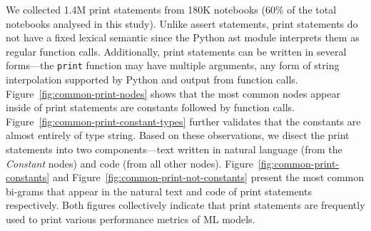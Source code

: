 We collected 1.4M print statements from 180K notebooks (60\% of the total notebooks analysed in this study). Unlike assert statements, print statements do not have a fixed lexical semantic since the Python ast module interprets them as regular function calls. Additionally, print statements can be written in several forms---the \lstinline{print} function may have multiple arguments, any form of string interpolation supported by Python and output from function calls. Figure~\ref{fig:common-print-nodes} shows that the most common nodes appear inside of print statements are constants followed by function calls. Figure~\ref{fig:common-print-constant-types} further validates that the constants are almost entirely of type string. Based on these observations, we disect the print statements into two components---text written in natural language (from the \emph{Constant} nodes) and code (from all other nodes). Figure~\ref{fig:common-print-constants} and Figure~\ref{fig:common-print-not-constants} present the most common bi-grams that appear in the natural text and code of print statements respectively. Both figures collectively indicate that print statements are frequently used to print various performance metrics of ML models.


